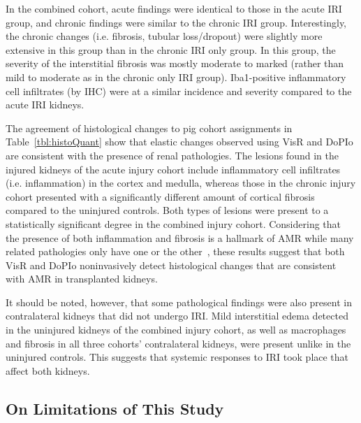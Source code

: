 In the combined cohort, acute findings were identical to those in the acute IRI group, and chronic findings were similar to the chronic IRI group. Interestingly, the chronic changes (i.e. fibrosis, tubular loss/dropout) were slightly more extensive in this group than in the chronic IRI only group. In this group, the severity of the interstitial fibrosis was mostly moderate to marked (rather than mild to moderate as in the chronic only IRI group). Iba1-positive inflammatory cell infiltrates (by IHC) were at a similar incidence and severity compared to the acute IRI kidneys.

The agreement of histological changes to pig cohort assignments in Table~\ref{tbl:histoQuant} show that elastic changes observed using VisR and DoPIo are consistent with the presence of renal pathologies. The lesions found in the injured kidneys of the acute injury cohort include inflammatory cell infiltrates (i.e. inflammation) in the cortex and medulla, whereas those in the chronic injury cohort presented with a significantly different amount of cortical fibrosis compared to the uninjured controls. Both types of lesions were present to a statistically significant degree in the combined injury cohort. Considering that the presence of both inflammation and fibrosis is a hallmark of AMR while many related pathologies only have one or the other~\cite{loupy_Banff_2020}, these results suggest that both VisR and DoPIo noninvasively detect histological changes that are consistent with AMR in transplanted kidneys.

It should be noted, however, that some pathological findings were also present in contralateral kidneys that did not undergo IRI. Mild interstitial edema detected in the uninjured kidneys of the combined injury cohort, as well as macrophages and fibrosis in all three cohorts' contralateral kidneys, were present unlike in the uninjured controls. This suggests that systemic responses to IRI took place that affect both kidneys.

\subsection{On Limitations of This Study}


